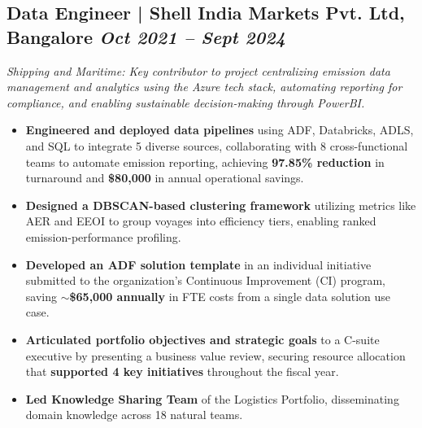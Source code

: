 \documentclass[10pt,a4paper]{article}
\begin{document}
\subsection{Data Engineer | Shell India Markets Pvt. Ltd, Bangalore \hfill
\textit{Oct 2021 -- Sept 2024}}
\textit{Shipping and Maritime: Key contributor to project centralizing emission data management and analytics using the Azure tech stack, automating reporting for compliance, and enabling sustainable decision-making through PowerBI.}
\begin{itemize}
    \item \textbf{Engineered and deployed data pipelines} using ADF, Databricks, ADLS, and SQL to integrate 5 diverse sources, collaborating with 8 cross-functional teams to automate emission reporting, achieving \textbf{97.85\% reduction} in turnaround and \textbf{\$80,000} in annual operational savings.
    \item \textbf{Designed a DBSCAN-based clustering framework} utilizing metrics like AER and EEOI to group voyages into efficiency tiers, enabling ranked emission-performance profiling.
    \item \textbf{Developed an ADF solution template} in an individual initiative submitted to the organization's Continuous Improvement (CI) program, saving \textbf{$\sim$\$65,000 annually} in FTE costs from a single data solution use case.
    \item \textbf{Articulated portfolio objectives and strategic goals} to a C-suite executive by presenting a business value review, securing resource allocation that \textbf{supported 4 key initiatives} throughout the fiscal year.
    \item \textbf{Led Knowledge Sharing Team} of the Logistics Portfolio, disseminating domain knowledge across 18 natural teams.
\end{itemize}
\vspace{0.3em}
\end{document}
